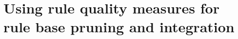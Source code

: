 
\chapter{Using rule quality measures for rule base pruning and integration}
\normalsize
\label{ch9}
	\minitoc
\clearpage
